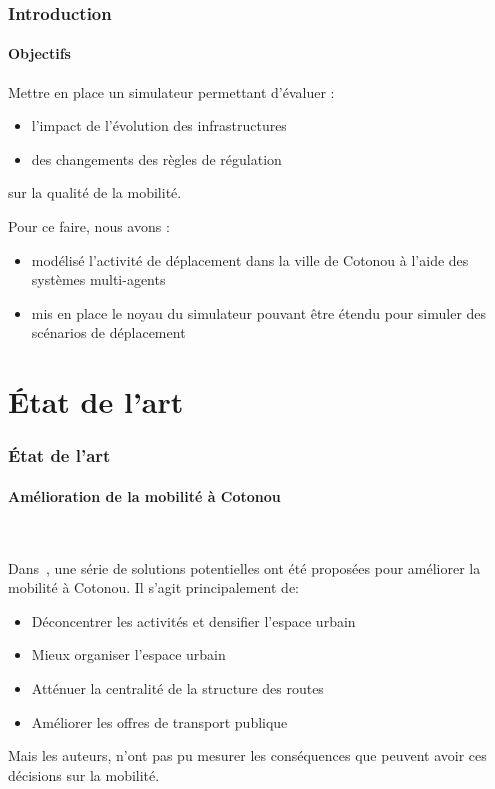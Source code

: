 \begin{frame}
    \frametitle{Introduction}
    \framesubtitle{Objectifs}
    Mettre en place un simulateur permettant d'évaluer :
    \begin{itemize}
        \item l'impact de l'évolution des infrastructures
        \item des changements des règles de régulation
    \end{itemize}
    \pause{}%
    sur la qualité de la mobilité.

    Pour ce faire, nous avons :
    \begin{itemize}
        \item modélisé l'activité de déplacement dans la ville de Cotonou à l'aide des systèmes multi-agents
        \item mis en place le noyau du simulateur pouvant être étendu pour simuler des scénarios de déplacement
    \end{itemize}
\end{frame}


\section{État de l'art}\label{sec:etat_art}
\begin{frame}
    \frametitle{État de l'art}
    \framesubtitle{Amélioration de la mobilité à Cotonou}

    \begin{block}{~\autocite{adonon_problematique}}

        Dans~\autocite{adonon_problematique}, une série de solutions potentielles ont été proposées pour améliorer la mobilité à Cotonou.
        Il s'agit principalement de:

        \begin{itemize}
            \item Déconcentrer les activités et densifier l'espace urbain
            \item Mieux organiser l'espace urbain
            \item Atténuer la centralité de la structure des routes
            \item Améliorer les offres de transport publique
        \end{itemize}

    \end{block}
    \pause{}
    Mais les auteurs, n'ont pas pu mesurer les conséquences que peuvent avoir ces décisions sur la mobilité.
\end{frame}

